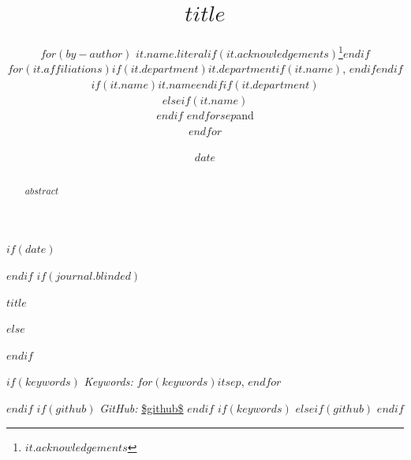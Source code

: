 

\def\spacingset#1{\renewcommand{\baselinestretch}%
{#1}\small\normalsize} \spacingset{1}



$if(date)$
\date{$date$}
$endif$
$if(journal.blinded)$
\spacingset{.8}
\bigskip
\bigskip
\bigskip
\begin{center}
  {\LARGE\bf $title$}
\end{center}
\smallskip
\bigskip
\spacingset{1}
$else$
\title{\bf $title$}
\author{
$for(by-author)$
$it.name.literal$$if(it.acknowledgements)$\thanks{$it.acknowledgements$}$endif$\\
$for(it.affiliations)$$if(it.department)$$it.department$$if(it.name)$, $endif$$endif$$if(it.name)$$it.name$$endif$$if(it.department)$\\$elseif(it.name)$\\$endif$
$endfor$$sep$and\\$endfor$}
\maketitle
$endif$

\bigskip
\bigskip
\begin{abstract}
$abstract$
\end{abstract}

$if(keywords)$
\noindent%
{\it Keywords:} $for(keywords)$$it$$sep$, $endfor$

$endif$
$if(github)$
\noindent%
{\it GitHub:} \url{$github$}
$endif$
$if(keywords)$
\vfill
$elseif(github)$
\vfill
$endif$

\newpage
\spacingset{1.9} %

